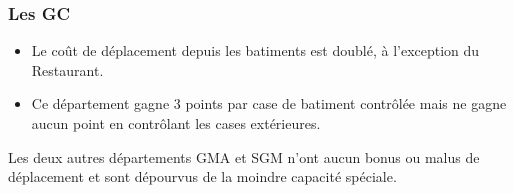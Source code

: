 \subsubsection{Les GC}
\begin{itemize}
\item Le coût de déplacement depuis les batiments est doublé, à l'exception du Restaurant. 
\item Ce département gagne 3 points par case de batiment contrôlée mais ne gagne aucun point en contrôlant les cases extérieures. 
\end{itemize}

Les deux autres départements GMA et SGM n'ont aucun bonus ou malus de déplacement et sont dépourvus de la moindre capacité spéciale.
